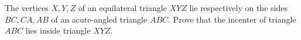 The vertices $X, Y , Z$ of an equilateral triangle $XYZ$ lie respectively on the sides $BC, CA, AB$ of an acute-angled triangle $ABC.$ Prove that the incenter of triangle $ABC$ lies inside triangle $XYZ.$